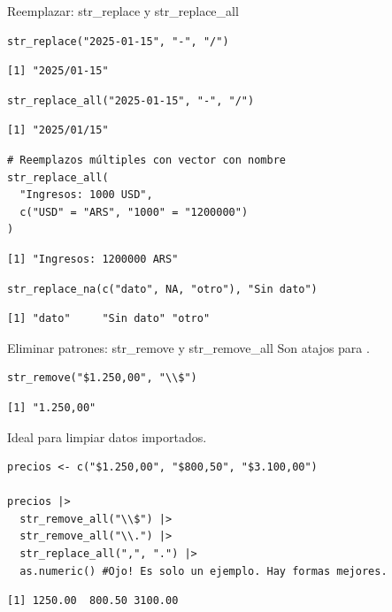 \documentclass[8pt]{beamer}
\begin{document}
\begin{frame}[fragile]{Reemplazar: str\_replace y str\_replace\_all}
\begin{lstlisting}[style=RScript]
str_replace("2025-01-15", "-", "/")
\end{lstlisting}
\begin{lstlisting}[style=RConsole]
[1] "2025/01-15"
\end{lstlisting}

\begin{lstlisting}[style=RScript]
str_replace_all("2025-01-15", "-", "/")
\end{lstlisting}
\begin{lstlisting}[style=RConsole]
[1] "2025/01/15"
\end{lstlisting}
\begin{lstlisting}[style=RScript]
# Reemplazos múltiples con vector con nombre
str_replace_all(
  "Ingresos: 1000 USD",
  c("USD" = "ARS", "1000" = "1200000")
)
\end{lstlisting}
\begin{lstlisting}[style=RConsole]
[1] "Ingresos: 1200000 ARS"
\end{lstlisting}

\begin{lstlisting}[style=RScript]
str_replace_na(c("dato", NA, "otro"), "Sin dato")
\end{lstlisting}
\begin{lstlisting}[style=RConsole]
[1] "dato"     "Sin dato" "otro"
\end{lstlisting}
\end{frame}




\begin{frame}[fragile]{Eliminar patrones: str\_remove y str\_remove\_all}
	Son atajos para .

\begin{lstlisting}[style=RScript]
str_remove("$1.250,00", "\\$")
\end{lstlisting}
\begin{lstlisting}[style=RConsole]
[1] "1.250,00"
\end{lstlisting}

	Ideal para limpiar datos importados.
\begin{lstlisting}[style=RScript]
precios <- c("$1.250,00", "$800,50", "$3.100,00")

precios |>
  str_remove_all("\\$") |>
  str_remove_all("\\.") |>
  str_replace_all(",", ".") |>
  as.numeric() #Ojo! Es solo un ejemplo. Hay formas mejores.
\end{lstlisting}
\begin{lstlisting}[style=RConsole]
[1] 1250.00  800.50 3100.00
\end{lstlisting}
\end{frame}
\end{document}
